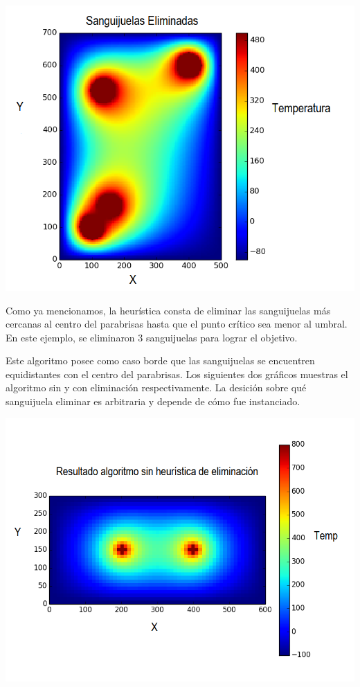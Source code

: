 	\begin{center}
		\includegraphics[scale=0.5]{./img/test5_conkill.png}
	\end{center}

	Como ya mencionamos, la heurística consta de eliminar las sanguijuelas más cercanas al centro del parabrisas hasta que el punto crítico sea menor al umbral. En este ejemplo, se eliminaron 3 sanguijuelas para lograr el objetivo.

	Este algoritmo posee como caso borde que las sanguijuelas se encuentren equidistantes con el centro del parabrisas. Los siguientes dos gráficos muestras el algoritmo sin y con eliminación respectivamente. La desición sobre qué sanguijuela eliminar es arbitraria y depende de cómo fue instanciado.

	\begin{center}
		\includegraphics[scale=0.5]{./img/test6_sinkill.png}
	\end{center}

